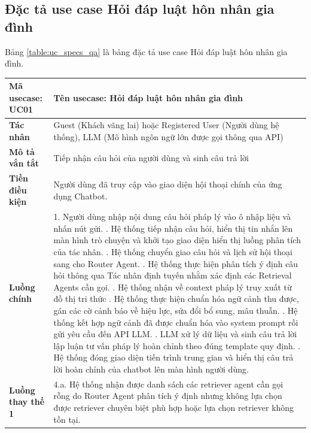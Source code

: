 \documentclass[../DoAn.tex]{subfiles}
\begin{document}
\subsection{Đặc tả use case Hỏi đáp luật hôn nhân gia đình}
Bảng \ref{table:uc_specs_qa} là bảng đặc tả use case Hỏi đáp luật hôn nhân gia đình.
\begin{table}[H]
\centering
\begin{tabular}{|p{3.5cm}|p{11.5cm}|}
\hline
\textbf{Mã usecase:} UC01 & \textbf{Tên usecase:} Hỏi đáp luật hôn nhân gia đình\\ \hline
\textbf{Tác nhân} & Guest (Khách vãng lai) hoặc Registered User (Người dùng hệ thống), LLM (Mô hình ngôn ngữ lớn được gọi thông qua API) \\ \hline
\textbf{Mô tả vắn tắt} & Tiếp nhận câu hỏi của người dùng và sinh câu trả lời \\ \hline
\textbf{Tiền điều kiện} & Người dùng đã truy cập vào giao diện hội thoại chính của ứng dụng Chatbot. \\ \hline
\textbf{Luồng chính} &
1. Người dùng nhập nội dung câu hỏi pháp lý vào ô nhập liệu và nhấn nút gửi. \newline
2. Hệ thống tiếp nhận câu hỏi, hiển thị tin nhắn lên màn hình trò chuyện và khởi tạo giao diện hiển thị luồng phân tích của tác nhân. \newline
3. Hệ thống chuyển giao câu hỏi và lịch sử hội thoại sang cho Router Agent. \newline
4. Hệ thống thực hiện phân tích ý định câu hỏi thông qua Tác nhân định tuyến nhằm xác định các Retrieval Agents cần gọi. \newline
5. Hệ thống nhận về context pháp lý truy xuất từ đồ thị tri thức \newline
6. Hệ thống thực hiện chuẩn hóa ngữ cảnh thu được, gán các cờ cảnh báo về hiệu lực, sửa đổi bổ sung, mâu thuẫn. \newline
7. Hệ thống kết hợp ngữ cảnh đã được chuẩn hóa vào system prompt rồi gửi yêu cầu đến API LLM. \newline
8. LLM xử lý dữ liệu và sinh câu trả lời lập luận tư vấn pháp lý hoàn chỉnh theo đúng template quy định. \newline
9. Hệ thống đóng giao diện tiến trình trung gian và hiển thị câu trả lời hoàn chỉnh của chatbot lên màn hình người dùng. \\ \hline
\textbf{Luồng thay thế 1} &
4.a. Hệ thống nhận được danh sách các retriever agent cần gọi rỗng do Router Agent phân tích ý định nhưng không lựa chọn được retriever chuyên biệt phù hợp hoặc lựa chọn retriever không tồn tại. \newline

\end{tabular}
\end{table}
\end{document}
